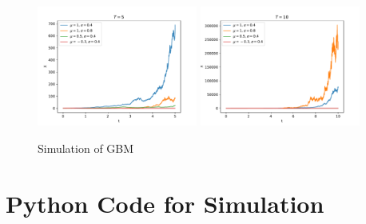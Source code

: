     \begin{figure}
        \centering
        \includegraphics[width=0.47\textwidth]{T=5}
        \includegraphics[width=0.47\textwidth]{T=10}
        \caption{Simulation of GBM}
        \label{fig:simulation}
    \end{figure}

    \appendix
    \section{Python Code for Simulation}
    \begin{fullwidth}
    
    \end{fullwidth}